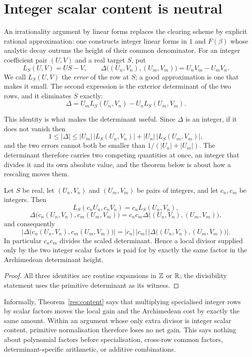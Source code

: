 \documentclass[11pt]{article}
\begin{document}
\section{Integer scalar content is neutral}\label{sec:primitive}

An irrationality argument by linear forms replaces the clearing scheme by
explicit rational approximation: one constructs integer linear forms in $1$ and
$F(\beta)$ whose analytic decay outruns the height of their common denominator.
For an integer coefficient pair \((U,V)\) and a real target \(S\), put
\[
 L_S(U,V)=US-V,
 \qquad
 \Delta\bigl((U_n,V_n),(U_m,V_m)\bigr)=U_nV_m-U_mV_n.
\]
We call \(L_S(U,V)\) the \emph{error} of the row at \(S\); a good approximation
is one that makes it small.  The second expression is the exterior determinant
of the two rows, and it eliminates \(S\) exactly:
\[
\Delta=U_mL_S(U_n,V_n)-U_nL_S(U_m,V_m).
\]

This identity is what makes the determinant useful.  Since \(\Delta\) is an
integer, if it does not vanish then
\[
 1\le|\Delta|
  \le|U_m|\,\bigl|L_S(U_n,V_n)\bigr|+|U_n|\,\bigl|L_S(U_m,V_m)\bigr|,
\]
and the two errors cannot both be smaller than
\(1/(|U_n|+|U_m|)\).  The determinant therefore carries two competing
quantities at once, an integer that divides it and its own absolute value, and
the theorem below is about how a rescaling moves them.

\begin{theorem}\label{res:content}
Let \(S\) be real, let \((U_n,V_n)\) and \((U_m,V_m)\) be pairs of integers, and
let \(c_n,c_m\) be integers.  Then
\[
 L_S(c_nU_n,c_nV_n)=c_nL_S(U_n,V_n),
\]
\[
 \Delta\bigl(c_n(U_n,V_n),c_m(U_m,V_m)\bigr)
 =c_nc_m\Delta\bigl((U_n,V_n),(U_m,V_m)\bigr),
\]
and consequently
\[
 \left|\Delta\bigl(c_n(U_n,V_n),c_m(U_m,V_m)\bigr)\right|
 =|c_n|\,|c_m|\,
   \left|\Delta\bigl((U_n,V_n),(U_m,V_m)\bigr)\right|.
\]
In particular \(c_nc_m\) divides the scaled determinant.  Hence a local
divisor supplied only by the two integer scalar factors is paid for by exactly
the same factor in the Archimedean determinant height.
\end{theorem}

\begin{proof}
All three identities are routine expansions in \(\mathbb{Z}\) or \(\mathbb{R}\); the
divisibility statement uses the primitive determinant as its witness.
\end{proof}

Informally, Theorem~\ref{res:content} says that multiplying specialised integer
rows by scalar factors moves the local gain and the Archimedean cost by exactly
the same amount.  Within an argument whose only extra divisor is integer scalar
content, primitive normalisation therefore loses no net gain.  This says
nothing about polynomial factors before specialisation, cross-row common
factors, determinant-specific arithmetic, or additive combinations.
\end{document}
